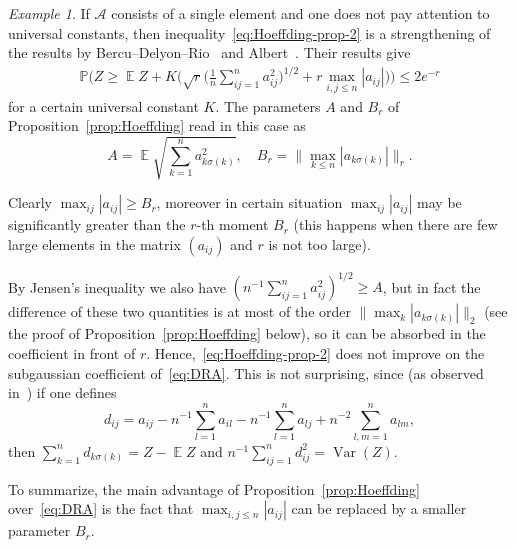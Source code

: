 \documentclass[a4paper]{amsart}
\theoremstyle{definition}
\theoremstyle{remark}
\newtheorem{example}[theorem]{Example}
\numberwithin{equation}{section}
\DeclareMathOperator{\EE}{\mathbb{E}} %
\newcommand*{\PP}{\mathbb{P}} %
\DeclareMathOperator{\Var}{Var}	%
\begin{document}
\begin{example}
If $\mathcal{A}$ consists of a single element and one does not pay attention to universal constants, then inequality~\eqref{eq:Hoeffding-prop-2} is a strengthening of the results by Bercu--Delyon--Rio~\cite{MR3363542} and Albert~\cite{mlis2018concentration}. Their results give
\begin{align}\label{eq:DRA}
  \PP\Big(Z \ge \EE Z + K \Big(\sqrt{r}\Big(\frac{1}{n} \sum_{ij=1}^n a_{ij}^2\Big)^{1/2} + r\max_{i,j\le n}|a_{ij}|\Big)\Big) \le 2e^{-r}
\end{align}
for a certain universal constant $K$. The parameters $A$ and $B_r$ of Proposition~\ref{prop:Hoeffding} read in this case as
\begin{displaymath}
  A = \EE\sqrt{\sum_{k=1}^n a_{k\sigma(k)}^2}, \quad  B_r = \big\|\max_{k\le n}|a_{k\sigma(k)}|\big\|_r.
\end{displaymath}

Clearly $\max_{ij}|a_{ij}| \ge B_r$, moreover in certain situation $\max_{ij} |a_{ij}|$ may be significantly greater than the $r$-th moment $B_r$ (this happens when there are few large elements in the matrix $(a_{ij})$ and $r$ is not too large).

By Jensen's inequality we also have  $(n^{-1}\sum_{ij=1}^n a_{ij}^2)^{1/2} \ge A$, but in fact the difference of these two quantities is at most of the order $\|\max_{k}|a_{k\sigma(k)}|\|_2$ (see the proof of Proposition~\ref{prop:Hoeffding} below), so it can be absorbed in the coefficient in front of $r$. Hence,~\eqref{eq:Hoeffding-prop-2} does not improve on the subgaussian coefficient of~\eqref{eq:DRA}. This is not surprising, since (as observed in~\cite{MR3363542}) if one defines
\[
d_{ij} = a_{ij} - n^{-1}\sum_{l=1}^n a_{il} - n^{-1}\sum_{l=1}^n a_{lj} + n^{-2}\sum_{l,m=1}^n a_{lm},
\]
then $\sum_{k=1}^n d_{k\sigma(k)} = Z - \EE Z$ and $n^{-1} \sum_{ij=1}^n d_{ij}^2 = \Var(Z)$.

To summarize, the main advantage of Proposition~\ref{prop:Hoeffding} over~\eqref{eq:DRA} is the fact that $\max_{i,j\le n} |a_{ij}|$ can be replaced by a smaller parameter $B_r$.
\end{example}
\end{document}
